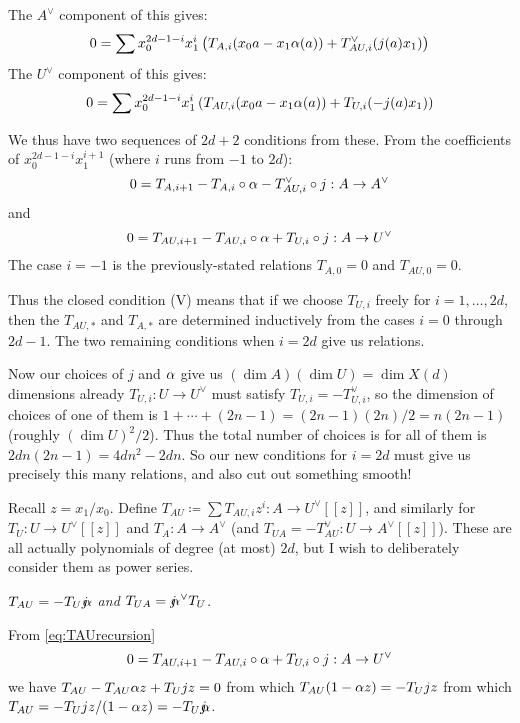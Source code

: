 {The $A^\vee$ component of this gives:
$$
0 = \sum x_0^{2d-1-i} x_1^i \left( T_{A,i} (x_0a -x_1 \alpha(a)) +  T_{AU,i}^\vee  (j(a) x_1) \right)
$$
The $U^\vee$ component of this gives:
$$0 = \sum x_0^{2d-1-i} x_1^i \left( T_{AU,i} (x_0a -x_1 \alpha(a)) +  T_{U,i}  (-j(a) x_1) \right)
$$

We thus have two sequences of $2d+2$ conditions from these.   From the coefficients of $x_0^{2d-1-i} x_1^{i+1}$ (where $i$ runs from $-1$ to $2d$):
\begin{equation}\label{eq:TArecursion}
  0 = T_{A, i+1} - T_{A,i} \circ \alpha - T_{AU,i}^\vee \circ j : A \rightarrow A^\vee
  \end{equation}
and
\begin{equation}\label{eq:TAUrecursion}
  0 = T_{AU, i+1}   - T_{AU,i} \circ \alpha + T_{U,i} \circ j: A \rightarrow U^\vee
  \end{equation}
The  case $i=-1$ is the previously-stated relations $T_{A,0}=0$ and $T_{AU,0}=0$.

Thus the closed condition (V) means that if we choose $T_{U,i}$ freely for $i=1, \dots, 2d$,
then the $T_{AU,*}$ and $T_{A,*}$ are determined inductively from the cases $i=0$ through $2d-1$.
The two remaining conditions when $i=2d$ give us relations.

Now our choices of $j$ and $\alpha$ give us $(\dim A)(\dim U) = \dim X(d)$ dimensions already
$T_{U,i}:U \rightarrow U^\vee$ must satisfy $T_{U,i} = - T_{U, i}^\vee$, so the dimension
of choices of one of them is $1 + \cdots+ (2n-1) = (2n-1)(2n)/2= n(2n-1)$ (roughly $(\dim U)^2/2$).
Thus the total number of choices is for all of them is $2dn(2n-1)=4dn^2-2dn$.
So our new conditions for $i=2d$ must give us precisely this many relations, and also cut out something smooth!



Recall $z=x_1/x_0$.  Define $\boxed{T_{AU}} \coloneq \sum T_{AU,i} z^i :  A \rightarrow U^\vee[[z]]$, and similarly for $\boxed{T_U} : U \rightarrow U^\vee[[z]]$ and $\boxed{T_A}: A \rightarrow A^\vee$ (and $\boxed{T_{UA}} = -T_{AU}^\vee: U \rightarrow A^\vee[[z]]$).  These are all actually polynomials of degree (at most) $2d$, but I wish to deliberately consider them as power series.

  {\em $T_{AU} = - T_U \mathord{j\mkern-7mu\alpha}$ and $T_{UA} = \mathord{j\mkern-7mu\alpha}^\vee T_U$.}

\bpf From \eqref{eq:TAUrecursion}
$$
0 = T_{AU, i+1}   - T_{AU,i} \circ \alpha + T_{U,i} \circ j: A \rightarrow U^\vee$$
we have
$T_{AU} - T_{AU} \alpha z + T_U jz = 0$ from which $T_{AU} (1-\alpha z) = - T_U jz$ from which
$T_{AU} = -T_U jz / (1-\alpha z) = - T_U \mathord{j\mkern-7mu\alpha}$. \epf

}
